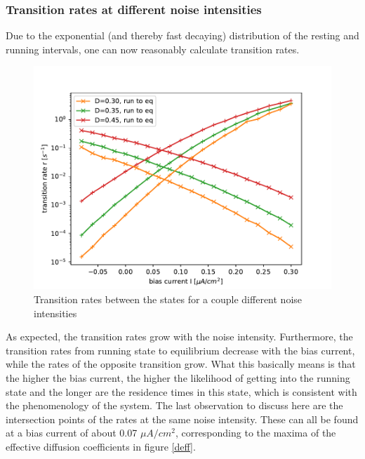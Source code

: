 \documentclass[12pt,a4paper]{article}
\begin{document}
\subsubsection{Transition rates at different noise intensities}
Due to the exponential (and thereby fast decaying) distribution of the resting and running intervals, one can now reasonably calculate transition rates.
\begin{figure}[H]
	\centering
	\includegraphics[scale=1]{tranratesneur31.pdf}\caption{Transition rates between the states for a couple different noise intensities}
	\label{tranrateneur}
\end{figure}
As expected, the transition rates grow with the noise intensity. Furthermore, the transition rates from running state to equilibrium decrease with the bias current, while the rates of the opposite transition grow. What this basically means is that the higher the bias current, the higher the likelihood of getting into the running state and the longer are the residence times in this state, which is consistent with the phenomenology of the system. The last observation to discuss here are the intersection points of the rates at the same noise intensity. These can all be found at a bias current of about 0.07 $\mu A/cm^2$, corresponding to the maxima of the effective diffusion coefficients in figure \ref{deff}.
\end{document}
